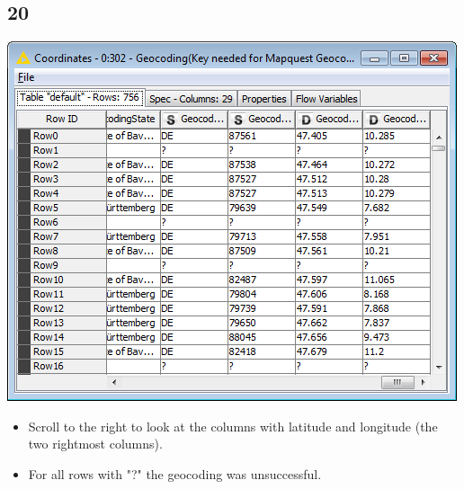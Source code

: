 \documentclass{beamer}
\begin{document}
\subsection{20}
\begin{frame}
	\begin{center}
  		\includegraphics[height=0.6\textheight]{20.png}
	\end{center}
	\begin{itemize}
		\item Scroll to the right to look at the columns with latitude and longitude (the two rightmost columns).
		\item For all rows with "?" the geocoding was unsuccessful.
	\end{itemize}
\end{frame}
\end{document}
